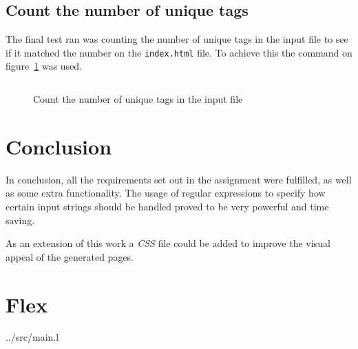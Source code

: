 \documentclass[a4paper]{report}
\begin{document}
\section{Count the number of unique tags}

The final test ran was counting the number of unique tags in the input file to
see if it matched the number on the \texttt{index.html} file. To achieve this
the command on figure~\ref{fig:test_count_unique_tags} was used.

\begin{figure}[H]
    \inputminted{bash}{test_count_unique_tags.sh}
    \caption{Count the number of unique tags in the input
    file}\label{fig:test_count_unique_tags}
\end{figure}

\chapter{Conclusion}

In conclusion, all the requirements set out in the assignment were fulfilled, as
well as some extra functionality. The usage of regular expressions to specify
how certain input strings should be handled proved to be very powerful and time
saving.

As an extension of this work a \textit{CSS} file could be added to
improve the visual appeal of the generated pages.

\appendix

\chapter{Flex}


{../src/main.l}
\end{document}
